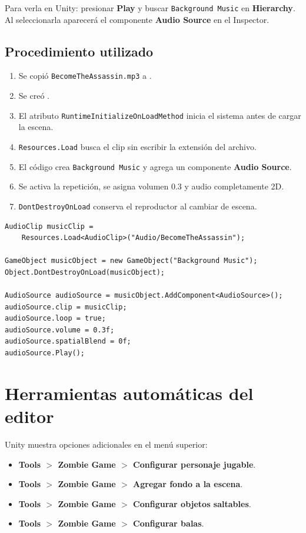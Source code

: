 \documentclass[11pt,a4paper]{article}
\newcommand{\component}[1]{\textbf{\textcolor{metalBlue}{#1}}}
\begin{document}
Para verla en Unity: presionar \textbf{Play} y buscar \texttt{Background Music} en \textbf{Hierarchy}. Al seleccionarla aparecerá el componente \component{Audio Source} en el Inspector.

\subsection{Procedimiento utilizado}

\begin{enumerate}
  \item Se copió \texttt{BecomeTheAssassin.mp3} a .
  \item Se creó .
  \item El atributo \texttt{RuntimeInitializeOnLoadMethod} inicia el sistema antes de cargar la escena.
  \item \texttt{Resources.Load} busca el clip sin escribir la extensión del archivo.
  \item El código crea \texttt{Background Music} y agrega un componente \component{Audio Source}.
  \item Se activa la repetición, se asigna volumen 0.3 y audio completamente 2D.
  \item \texttt{DontDestroyOnLoad} conserva el reproductor al cambiar de escena.
\end{enumerate}

\begin{lstlisting}[style=codestyle]
AudioClip musicClip =
    Resources.Load<AudioClip>("Audio/BecomeTheAssassin");

GameObject musicObject = new GameObject("Background Music");
Object.DontDestroyOnLoad(musicObject);

AudioSource audioSource = musicObject.AddComponent<AudioSource>();
audioSource.clip = musicClip;
audioSource.loop = true;
audioSource.volume = 0.3f;
audioSource.spatialBlend = 0f;
audioSource.Play();
\end{lstlisting}

\section{Herramientas automáticas del editor}

Unity muestra opciones adicionales en el menú superior:

\begin{itemize}
  \item \textbf{Tools $>$ Zombie Game $>$ Configurar personaje jugable}.
  \item \textbf{Tools $>$ Zombie Game $>$ Agregar fondo a la escena}.
  \item \textbf{Tools $>$ Zombie Game $>$ Configurar objetos saltables}.
  \item \textbf{Tools $>$ Zombie Game $>$ Configurar balas}.
\end{itemize}
\end{document}
